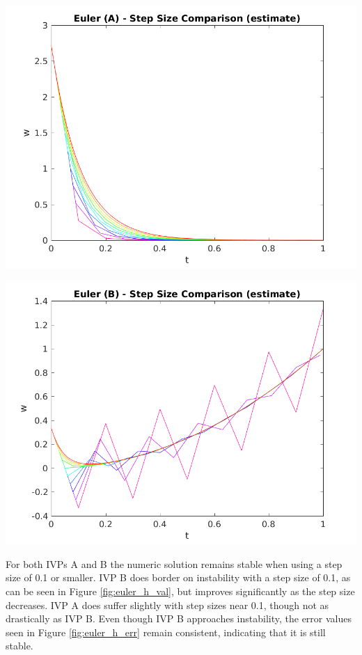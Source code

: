 \documentclass{article}
\begin{document}
\begin{center}
	\centering
    \begin{minipage}{0.5\textwidth}
        \centering
	    \includegraphics[width=1\textwidth]{../output/a_euler_h_val.png}
    \end{minipage}\hfill
    \begin{minipage}{0.5\textwidth}
        \centering
	    \includegraphics[width=1\textwidth]{../output/b_euler_h_val.png}
    \end{minipage}
 	\label{fig:euler_h_val}
\end{center}

For both IVPs A and B the numeric solution remains stable when using a step size of 0.1 or smaller. IVP B does border on instability with a step size of 0.1, as can be seen in Figure \ref{fig:euler_h_val}, but improves significantly as the step size decreases. IVP A does suffer slightly with step sizes near 0.1, though not as drastically as IVP B. Even though IVP B approaches instability, the error values seen in Figure \ref{fig:euler_h_err} remain consistent, indicating that it is still stable.
\end{document}
